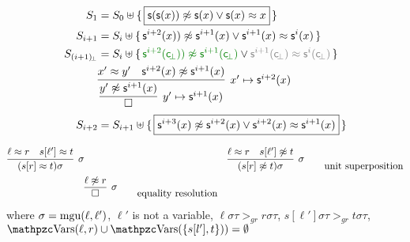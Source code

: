\begin{example}
\begin{align*}
	S_1 &= S_0\disjointunion \{\,
	\boxed{\msucc(\msucc(x)) \mNE \msucc(x) \lor \msucc(x) \mEQ x} \,
	\} 
	\\
	S_{i+1} &= S_i\disjointunion \{\,
		\msucc^{i+2}(x)) \mNE \msucc^{i+1} (x) \lor \msucc^{i+1}(x) \mEQ \msucc^i(x) \,
	\} 
	\\
	S_{(i+1)\!_\bot} &= S_i\disjointunion \{\,
	{\colHi \msucc^{i+2}(\consbot)) \mNE \msucc^{i+1} (\consbot)} \lor {\colG\msucc^{i+1}(\consbot) \mEQ \msucc^i(\consbot)} \,
	\} 
	\\
	&\infer[x'\mapsto \msucc^{i+2}(x)
	]{ 
		\infer[y'\mapsto \msucc^{i+1}(x)]{\emptyclause}{ y'\mNE \msucc^{i+1}(x) }
	}
	{x' \mEQ y' & \msucc^{i+2}(x)\mNE \msucc^{i+1}(x)}
	\\
	S_{i+2} &= S_{i+1}\disjointunion \{\,
	\boxed{\msucc^{i+3}(x) \mNE \msucc^{i+2}(x) \lor \msucc^{i+2}(x) \mEQ \msucc^{i+1}(x)} \,
	\} 
\end{align*}
\end{example}

\begin{definition}\label{def:unit:superposition}
	\begin{align*}
	\infer[\sigma]{(s[r]\mEQ t)\sigma}{\ell\mEQ r & s[\ell'] \mEQ t} & &
	\infer[\sigma]{(s[r]\mNE t)\sigma}{\ell\mEQ r & s[\ell'] \mNE t}\tag*{unit superposition}\\
	& \infer[\sigma]{\emptyclause}{\ell \mNE r}\tag*{equality resolution} \\
	\end{align*}
	where $\sigma = \operatorname{mgu}(\ell,\ell')$, 
	$\ell'$ is not a variable, 
	$\ell\sigma\tau >_{gr} r\sigma\tau$,
	$s[\ell']\sigma\tau >_{gr} t\sigma\tau$,
	$\var({\ell, r}) \cup \var(\{ s[l'],t \}) ) = \emptyset$
\end{definition}



